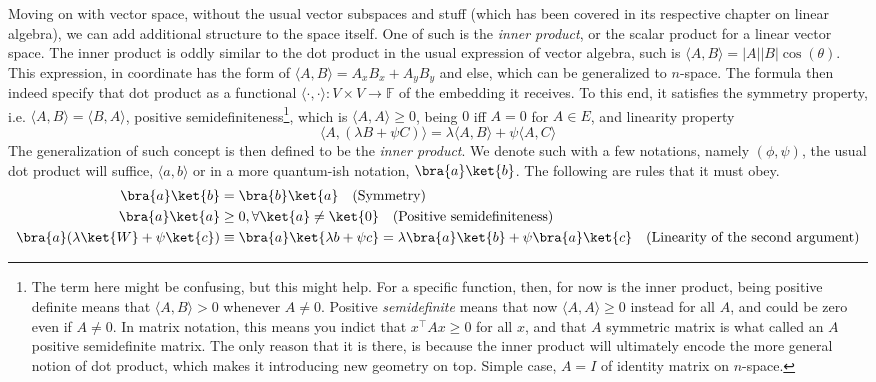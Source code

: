 Moving on with vector space, without the usual vector subspaces and stuff (which has been covered in its respective chapter on linear algebra), we can add additional structure to the space itself. One of such is the \textit{inner product}, or the scalar product for a linear vector space. The inner product is oddly similar to the dot product in the usual expression of vector algebra, such is $\langle A , B \rangle = |A||B|\cos{(\theta)}$. This expression, in coordinate has the form of $\langle A , B \rangle = A_{x}B_{x}+A_{y}B_{y}$ and else, which can be generalized to $n$-space. The formula then indeed specify that dot product as a functional $\langle \cdot, \cdot \rangle : V\times V \to \mathbb{F}$ of the embedding it receives. To this end, it satisfies the symmetry property, i.e. $\langle A , B \rangle = \langle B,A \rangle $, positive semidefiniteness\footnote{The term here might be confusing, but this might help. For a specific function, then, for now is the inner product, being positive definite means that $\langle A , B \rangle >0$ whenever $A\neq 0$. Positive \textit{semidefinite} means that now $\langle A ,A \rangle \geq 0$ instead for all $A$, and could be zero even if $A\neq 0$. In matrix notation, this means you indict that $x^{\top}Ax\geq 0$ for all $x$, and that $A$ symmetric matrix is what called an $A$ positive semidefinite matrix. The only reason that it is there, is because the inner product will ultimately encode the more general notion of dot product, which makes it introducing new geometry on top. Simple case, $A=I$ of identity matrix on $n$-space.}, which is $\langle A , A \rangle \geq 0$, being $0$ iff $A=0$ for $A\in E$, and linearity property 
\begin{equation*}
    \langle A , (\lambda B + \psi C) \rangle = \lambda \langle A , B \rangle + \psi \langle A , C \rangle  
\end{equation*} 
The generalization of such concept is then defined to be the \textit{inner product}. We denote such with a few notations, namely $(\phi,\psi)$, the usual dot product will suffice, $\langle a,b \rangle $ or in a more quantum-ish notation, $\bra{a}\ket{b}$. The following are rules that it must obey.
\begin{align}
    \bra{a}\ket{b} &= \bra{b}\ket{a} \quad \text{(Symmetry)}\\ 
    \bra{a}\ket{a} & \geq 0 , \forall \ket{a} \neq \ket{0}\quad \text{(Positive semidefiniteness)}\\
    \bra{a} (\lambda\ket{W}+\psi\ket{c}) &\equiv \bra{a}\ket{\lambda b + \psi c} = \lambda\bra{a}\ket{b} + \psi\bra{a}\ket{c} \quad \text{(Linearity of the second argument)}
\end{align}
